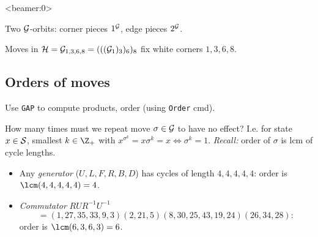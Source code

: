 \begin{slide}<beamer:0>
    \begin{overprint}
        \begin{center}
        \end{center}

        \scriptsize

        \normalsize Two $\mathcal{G}$-orbits: corner pieces $1^{\mathcal{G}}$, edge pieces $2^{\mathcal{G}}$.

        Moves in $\mathcal{H} = \mathcal{G}_{1,3,6,8} = (((\mathcal{G}_1)_3)_6)_8$ fix white corners $1,3,6,8$.

    \end{overprint}
\end{slide}

\subsection{Orders of moves}

\begin{slide}
    Use \texttt{GAP} to compute products, order (using \texttt{Order} cmd).

        {\scriptsize}

    How many times must we repeat move $\sigma \in \mathcal{G}$ to have no effect? \pause I.e. for state $x \in \mathcal{S}$, smallest $k \in \Z_+$ with $x^{\sigma^k} = x\sigma^k = x \iff \sigma^k = 1$. \pause \textit{Recall:} order of $\sigma$ is lcm of cycle lengths.

    \begin{itemize}
        \item Any \textit{generator} ($U,L,F,R,B,D$) has cycles of length $4,4,4,4,4$: order is $\lcm(4,4,4,4,4) = 4$. \pause
        \item \textit{Commutator} $RUR^{-1}U^{-1}$
              $$= (1,27,35,33,9,3)(2,21,5)(8,30,25,43,19,24)(26,34,28){:}$$
              order is $\lcm(6,3,6,3) = 6$.
    \end{itemize}
\end{slide}

